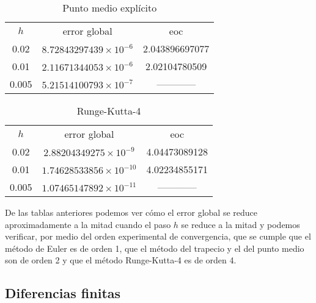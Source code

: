 \documentclass[spanish]{article}
\begin{document}
\begin{table}[h]
\caption{Punto medio explícito}
\centering
\begin{tabular}{ccc}
\hline \hline
$h$ & error global & eoc \\
0.02 & $8.72843297439 \times 10^{-6}$ & 2.043896697077 \\
0.01 & $2.11671344053 \times 10^{-6}$ & 2.02104780509 \\
0.005 & $5.21514100793 \times 10^{-7}$  & ------------ \\
\hline
\end{tabular}
\label{tab:hresult}
\end{table}

\begin{table}[h]
\caption{Runge-Kutta-4 }
\centering
\begin{tabular}{ccc}
\hline \hline
$h$ & error global & eoc \\
0.02 & $2.88204349275 \times 10^{-9}$ & 4.04473089128 \\
0.01 & $1.74628533856 \times 10^{-10}$ & 4.02234855171 \\
0.005 & $1.07465147892 \times 10^{-11}$  & ------------ \\
\hline
\end{tabular}
\label{tab:hresult}
\end{table}
\newpage
De las tablas anteriores podemos ver cómo el error global se reduce aproximadamente a la mitad cuando el paso $h$ se reduce a la mitad y podemos verificar, por medio del orden experimental de convergencia, que se cumple que el método de Euler es de orden 1, que el método del trapecio y el del punto medio son de orden 2 y que el método Runge-Kutta-4 es de orden 4.

\noindent
\subsection{Diferencias finitas}
\end{document}
